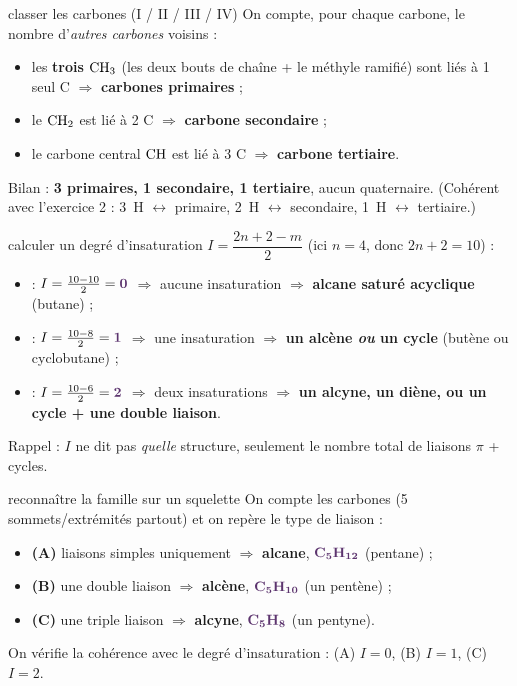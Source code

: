 \documentclass[11pt,a4paper]{article}
\newcommand{\rep}[1]{\textcolor{primarydark}{\textbf{#1}}}
\begin{document}
\begin{corr}{classer les carbones (I / II / III / IV)}
On compte, pour chaque carbone, le nombre d'\emph{autres carbones} voisins :
\begin{itemize}[leftmargin=1.6em,itemsep=1pt]
  \item les \textbf{trois} $\ce{CH3}$ (les deux bouts de chaîne + le méthyle ramifié) sont liés à 1 seul C $\Rightarrow$ \rep{carbones primaires} ;
  \item le $\ce{CH2}$ est lié à 2 C $\Rightarrow$ \rep{carbone secondaire} ;
  \item le carbone central $\ce{CH}$ est lié à 3 C $\Rightarrow$ \rep{carbone tertiaire}.
\end{itemize}
Bilan : \rep{3 primaires, 1 secondaire, 1 tertiaire}, aucun quaternaire. (Cohérent avec l'exercice 2 : 3~H $\leftrightarrow$ primaire, 2~H $\leftrightarrow$ secondaire, 1~H $\leftrightarrow$ tertiaire.)
\end{corr}

\begin{corr}{calculer un degré d'insaturation}
$I=\dfrac{2n+2-m}{2}$ (ici $n=4$, donc $2n+2=10$) :
\begin{itemize}[leftmargin=1.6em,itemsep=1pt]
  \item {} : $I=\frac{10-10}{2}=\rep{0}$ $\Rightarrow$ aucune insaturation $\Rightarrow$ \rep{alcane saturé acyclique} (butane) ;
  \item {} : $I=\frac{10-8}{2}=\rep{1}$ $\Rightarrow$ une insaturation $\Rightarrow$ \rep{un alcène \emph{ou} un cycle} (butène ou cyclobutane) ;
  \item {} : $I=\frac{10-6}{2}=\rep{2}$ $\Rightarrow$ deux insaturations $\Rightarrow$ \rep{un alcyne, un diène, ou un cycle + une double liaison}.
\end{itemize}
Rappel : $I$ ne dit pas \emph{quelle} structure, seulement le nombre total de liaisons $\pi$ + cycles.
\end{corr}

\begin{corr}{reconnaître la famille sur un squelette}
On compte les carbones (5 sommets/extrémités partout) et on repère le type de liaison :
\begin{itemize}[leftmargin=1.6em,itemsep=1pt]
  \item \textbf{(A)} liaisons simples uniquement $\Rightarrow$ \rep{alcane}, $\rep{\ce{C5H12}}$ (pentane) ;
  \item \textbf{(B)} une double liaison $\Rightarrow$ \rep{alcène}, $\rep{\ce{C5H10}}$ (un pentène) ;
  \item \textbf{(C)} une triple liaison $\Rightarrow$ \rep{alcyne}, $\rep{\ce{C5H8}}$ (un pentyne).
\end{itemize}
On vérifie la cohérence avec le degré d'insaturation : (A) $I=0$, (B) $I=1$, (C) $I=2$.
\end{corr}
\end{document}

